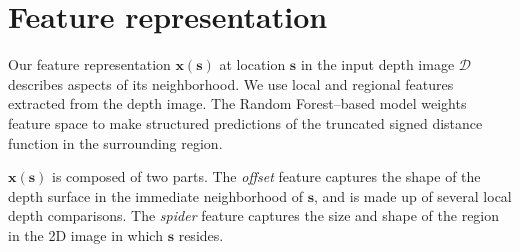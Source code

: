 \documentclass[10pt,twocolumn,letterpaper]{article}
\newcommand{\feat}{\mathbf{x}}
\newcommand{\rgbdimage}{\mathcal{D}}
\newcommand{\pixelidx}{\mathbf{s}}
\begin{document}
\section{Feature representation}
\label{sec:features}

\newcommand{\scalfeat}{x}

Our feature representation $\feat(\pixelidx)$ at location $\pixelidx$ in the input depth image $\rgbdimage$  describes aspects of its neighborhood.
We use local and regional features extracted from the depth image.
The Random Forest--based model weights feature space to make structured predictions of the truncated signed distance function in the surrounding region.

$\feat(\pixelidx)$ is composed of two parts.
The \emph{offset} feature captures the shape of the depth surface in the immediate neighborhood of $\pixelidx$, and is made up of several local depth comparisons.
The \emph{spider} feature captures the size and shape of the region in the 2D image in which $\pixelidx$ resides.
\end{document}
